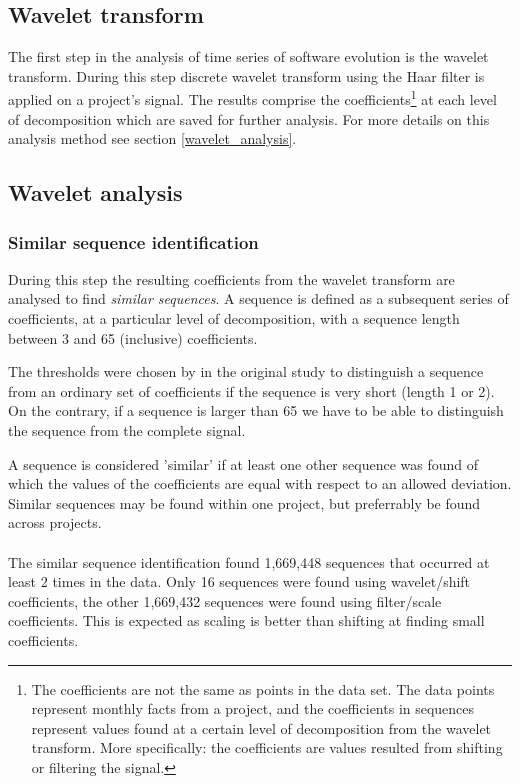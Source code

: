 \subsection{Wavelet transform}
The first step in the analysis of time series of software evolution is the
wavelet transform. During this step discrete wavelet transform using the Haar
filter is applied on a project's signal. The results comprise the
coefficients\footnote{The coefficients are not the same as points in the
data set. The data points represent monthly facts from a project, and the
coefficients in sequences represent values found at a certain level of
decomposition from the wavelet transform. More specifically: the coefficients
are values resulted from shifting or filtering the signal.} at each level of
decomposition which are saved for further analysis. For more details on this
analysis method see section \ref{wavelet_analysis}.

\subsection{Wavelet analysis}
\subsubsection{Similar sequence identification}
During this step the resulting coefficients from the wavelet transform are
analysed to find \emph{similar sequences}\rm. A sequence is defined as a
subsequent series of coefficients, at a particular level of decomposition, with
a sequence length between 3 and 65 (inclusive) coefficients.

The thresholds were chosen by \citet{karus2013} in the original study to
distinguish a sequence from an ordinary set of coefficients if the sequence is
very short (length 1 or 2). On the contrary, if a sequence is larger than 65 we
have to be able to distinguish the sequence from the complete signal.

A sequence is considered 'similar' if at least one other sequence was found of
which the values of the coefficients are equal with respect to an allowed
deviation. Similar sequences may be found within one project, but preferrably be
found across projects.

\paragraph{}
The similar sequence identification found 1,669,448 sequences that occurred
at least 2 times in the data. Only 16 sequences were found using wavelet/shift
coefficients, the other 1,669,432 sequences were found using filter/scale
coefficients. This is expected as scaling is better than shifting at finding
small coefficients.

